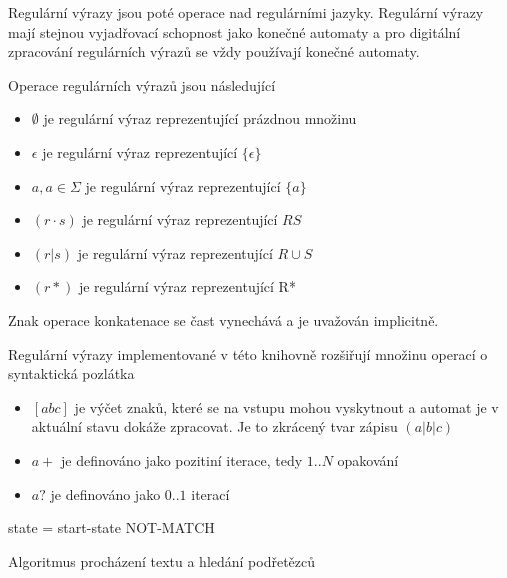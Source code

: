 Regulární výrazy jsou poté operace nad regulárními jazyky.
Regulární výrazy mají stejnou  vyjadřovací schopnost jako konečné automaty a pro digitální zpracování
regulárních výrazů se vždy používají konečné automaty.

Operace regulárních výrazů jsou následující

\begin{itemize}
\item{$\emptyset$ je regulární výraz reprezentující prázdnou množinu}
\item{$\epsilon$ je regulární výraz reprezentující $\{\epsilon\}$}
\item{$a, a \in \Sigma$ je regulární výraz reprezentující $\{a\}$}
\item{$(r \cdot s)$ je regulární výraz reprezentující $RS$}
\item{$(r | s)$ je regulární výraz reprezentující $R \cup S$}
\item{$(r*)$ je regulární výraz reprezentující R*}
\end{itemize}

Znak operace konkatenace %
se čast vynechává a je uvažován implicitně.

Regulární výrazy implementované v této knihovně rozšiřují množinu operací o syntaktická pozlátka

\begin{itemize}
	\item{$[abc]$ je výčet znaků, které se na vstupu mohou vyskytnout a automat je v aktuální stavu dokáže zpracovat. Je to zkrácený tvar zápisu $(a|b|c)$}
	\item{$a+$ je definováno jako pozitiní iterace, tedy $1..N$ opakování}
	\item{$a?$ je definováno jako $0..1$ iterací}
\end{itemize}

\begin{algorithm}
	state = start-state\;
	{
	}
	\Return NOT-MATCH\;
	\caption{Algoritmus procházení textu a hledání podřetězců}
\end{algorithm}

\cite{aho}

